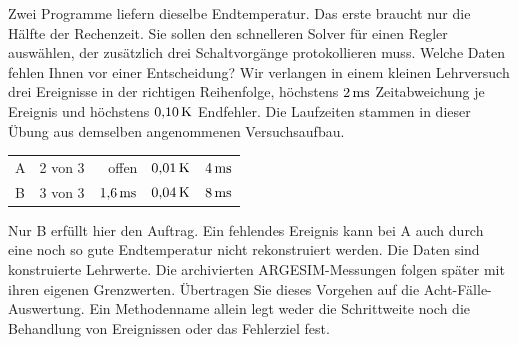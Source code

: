 Zwei Programme liefern dieselbe Endtemperatur. Das erste braucht nur die Hälfte der Rechenzeit. Sie sollen den schnelleren Solver für einen Regler auswählen, der zusätzlich drei Schaltvorgänge protokollieren muss. Welche Daten fehlen Ihnen vor einer Entscheidung?
Wir verlangen in einem kleinen Lehrversuch drei Ereignisse in der richtigen Reihenfolge, höchstens \(2\,\mathrm{ms}\) Zeitabweichung je Ereignis und höchstens \(0{,}10\,\mathrm{K}\) Endfehler. Die Laufzeiten stammen in dieser Übung aus demselben angenommenen Versuchsaufbau.
{\tblstart\begin{tabularx}{\linewidth}{@{}Yrrrr@{}}\toprule
{}&&&&\\\midrule
A&2 von 3&offen&\(0{,}01\,\mathrm{K}\)&\(4\,\mathrm{ms}\)\\
B&3 von 3&\(1{,}6\,\mathrm{ms}\)&\(0{,}04\,\mathrm{K}\)&\(8\,\mathrm{ms}\)\\\bottomrule\end{tabularx}\par}
Nur B erfüllt hier den Auftrag. Ein fehlendes Ereignis kann bei A auch durch eine noch so gute Endtemperatur nicht rekonstruiert werden. Die Daten sind konstruierte Lehrwerte. Die archivierten ARGESIM-Messungen folgen später mit ihren eigenen Grenzwerten.
Übertragen Sie dieses Vorgehen auf die Acht-Fälle-Auswertung. Ein Methodenname allein legt weder die Schrittweite noch die Behandlung von Ereignissen oder das Fehlerziel fest.


